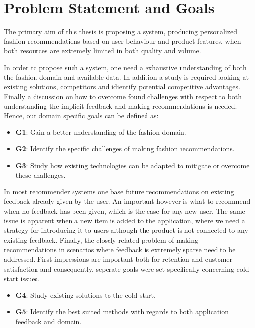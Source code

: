\section{Problem Statement and Goals}

The primary aim of this thesis is proposing a system, producing personalized
fashion recommendations based on user behaviour and product features, when both
resources are extremely limited in both quality and volume.

In order to propose such a system, one need a exhaustive understanding of both
the fashion domain and available data. In addition a study is required looking
at existing solutions, competitors and idientify potential competitive
advantages. Finally a discussion on how to overcome found challenges with
respect to both understanding the implicit feedback and making recommendations
is needed. Hence, our domain specific goals can be defined as:

\begin{itemize}
	\item \textbf{G1}: Gain a better understanding of the fashion domain.
  \item \textbf{G2}: Identify the specific challenges of making fashion recommendations.
  \item \textbf{G3}: Study how existing technologies can be adapted to mitigate or
  overcome these challenges.
\end{itemize}

In most recommender systems one base future recommendations on existing
feedback already given by the user. An important however is what to recommend
when no feedback has been given, which is the case for any new user. The same
issue is apparent when a new item is added to the application, where we need a
strategy for introducing it to users although the product is not connected to
any existing feedback. Finally, the closely related problem of making
recommendations in scenarios where feedback is extremely sparse need to be
addressed. First impressions are important both for retention and customer
satisfaction and consequently, seperate goals were set specifically concerning
cold-start issues.

\begin{itemize}
  \item \textbf{G4}: Study existing solutions to the cold-start.
  \item \textbf{G5}: Identify the best suited methods with regards to both application
  feedback and domain.
\end{itemize}

